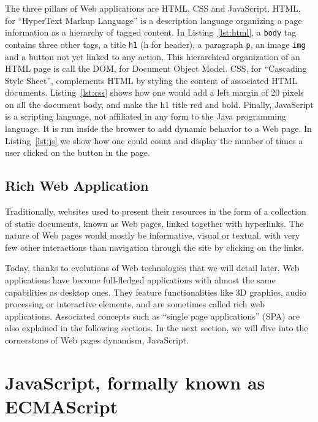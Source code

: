 The three pillars of Web applications are HTML, CSS and JavaScript.
HTML, for ``HyperText Markup Language'' is a description language
organizing a page information as a hierarchy of tagged content.
In Listing~\ref{lst:html}, a \verb|body| tag contains three other tags,
a title \verb|h1| (h for header), a paragraph \verb|p|, an image \verb|img|
and a button not yet linked to any action.
This hierarchical organization of an HTML page is call the DOM,
for Document Object Model.
CSS, for ``Cascading Style Sheet'', complements HTML by styling
the content of associated HTML documents.
Listing~\ref{lst:css} shows how one would add a left margin of 20 pixels
on all the document body, and make the h1 title red and bold.
Finally, JavaScript is a scripting language, not affiliated in any form
to the Java programming language.
It is run inside the browser to add dynamic behavior to a Web page.
In Listing~\ref{lst:js} we show how one could count and display
the number of times a user clicked on the button in the page.





\subsection{Rich Web Application}%
\label{sub:rich_web_application}

Traditionally, websites used to present their resources in the form of a collection
of static documents, known as Web pages, linked together with hyperlinks.
The nature of Web pages would mostly be informative, visual or textual,
with very few other interactions than navigation through the site by
clicking on the links.

Today, thanks to evolutions of Web technologies that we will detail later,
Web applications have become full-fledged applications with almost
the same capabilities as desktop ones.
They feature functionalities like 3D graphics, audio processing or interactive elements,
and are sometimes called rich web applications.
Associated concepts such as ``single page applications'' (SPA)
are also explained in the following sections.
In the next section, we will dive into the cornerstone of Web pages dynamism, JavaScript.


\section{JavaScript, formally known as ECMAScript}%
\label{sec:javascript_formally_known_as_ecmascript}

